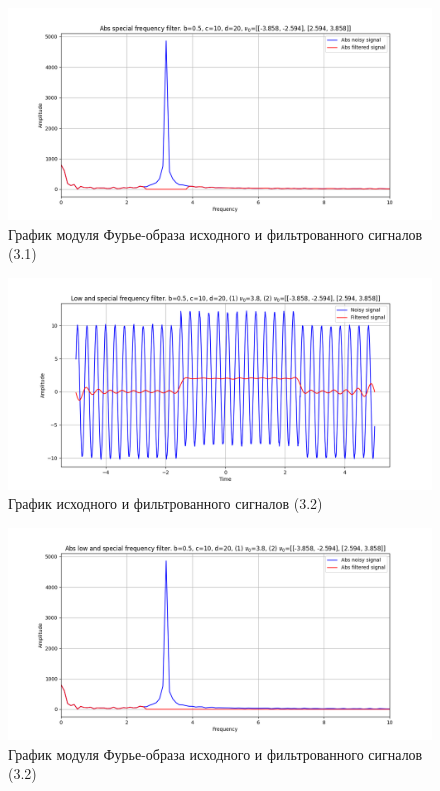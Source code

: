 \documentclass[a4paper, 12pt]{article}
\begin{document}
    \begin{figure}[H]
        \centering
        \includegraphics[scale=0.48]{3_abs_nospec.png}
        \captionsetup{skip=0pt}
        \caption{График модуля Фурье-образа исходного и фильтрованного сигналов (3.1)}
        \label{fig:fig7223}
    \end{figure}
    \begin{figure}[H]
        \centering
        \includegraphics[scale=0.48]{3_nospec_nohigh.png}
        \captionsetup{skip=0pt}
        \caption{График исходного и фильтрованного сигналов (3.2)}
        \label{fig:fig7723}
    \end{figure}
    \begin{figure}[H]
        \centering
        \includegraphics[scale=0.48]{3_abs_nospec_nohigh.png}
        \captionsetup{skip=0pt}
        \caption{График модуля Фурье-образа исходного и фильтрованного сигналов (3.2)}
        \label{fig:fig7823}
    \end{figure}
\end{document}

